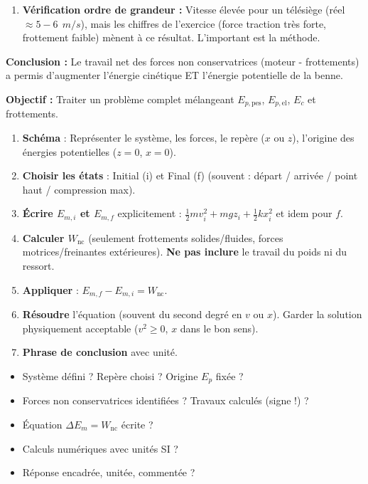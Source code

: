 \documentclass[11pt]{article}
\begin{document}
\begin{exoresolu}
\begin{enumerate}
        \[ 150 v_f^2 = 1,1425 \times 10^5 \]
        \[ v_f^2 = \frac{114250}{150} \approx 761,67 \]
        \[ v_f = \sqrt{761,67} \approx 27,6\ \SI{}{m/s} \]
        $\boxed{v_f \approx 27,6\ \SI{}{m/s}\ (\approx 99\ \SI{}{km/h})}$.
        \item \textbf{Vérification ordre de grandeur :} Vitesse élevée pour un télésiège (réel $\approx 5-6\ \SI{}{m/s}$), mais les chiffres de l'exercice (force traction très forte, frottement faible) mènent à ce résultat. L'important est la méthode.
    \end{enumerate}
    \textbf{Conclusion :} Le travail net des forces non conservatrices (moteur - frottements) a permis d'augmenter l'énergie cinétique ET l'énergie potentielle de la benne.
\end{exoresolu}

\begin{methode}
    \textbf{Objectif :} Traiter un problème complet mélangeant $E_{p,\text{pes}}$, $E_{p,\text{el}}$, $E_c$ et frottements.
    \begin{enumerate}
        \item \textbf{Schéma} : Représenter le système, les forces, le repère ($x$ ou $z$), l'origine des énergies potentielles ($z=0$, $x=0$).
        \item \textbf{Choisir les états} : Initial (i) et Final (f) (souvent : départ / arrivée / point haut / compression max).
        \item \textbf{Écrire $E_{m,i}$ et $E_{m,f}$} explicitement : $\frac{1}{2}m v_i^2 + m g z_i + \frac{1}{2}k x_i^2$ et idem pour $f$.
        \item \textbf{Calculer $W_{\text{nc}}$} (seulement frottements solides/fluides, forces motrices/freinantes extérieures). \textbf{Ne pas inclure} le travail du poids ni du ressort.
        \item \textbf{Appliquer} : $E_{m,f} - E_{m,i} = W_{\text{nc}}$.
        \item \textbf{Résoudre} l'équation (souvent du second degré en $v$ ou $x$). Garder la solution physiquement acceptable ($v^2 \ge 0$, $x$ dans le bon sens).
        \item \textbf{Phrase de conclusion} avec unité.
    \end{enumerate}
    \begin{aretenir}
        \begin{itemize}
            \item Système défini ? Repère choisi ? Origine $E_p$ fixée ?
            \item Forces non conservatrices identifiées ? Travaux calculés (signe !) ?
            \item Équation $\Delta E_m = W_{\text{nc}}$ écrite ?
            \item Calculs numériques avec unités SI ?
            \item Réponse encadrée, unitée, commentée ?
        \end{itemize}
    \end{aretenir}
\end{methode}
\end{document}
